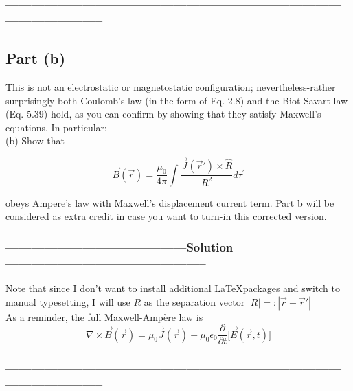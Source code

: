 \documentclass[a4paper,12pt]{article} %
\begin{document}
\subsubsection*{-----------------------------------------------------------------------------------------------------}
\subsection*{Part (b)}
This is not an electrostatic or magnetostatic configuration; nevertheless-rather surprisingly-both Coulomb's law (in the form of Eq. 2.8) and the Biot-Savart law (Eq. 5.39) hold, as you can confirm by showing that they satisfy Maxwell's equations. In particular:\\

(b) Show that

$$
\vec{B}(\vec{r})=\frac{\mu_0}{4 \pi} \int \frac{\vec{J}\left(\overrightarrow{r}'\right) \times \hat{R}}{R^2} d \tau^{\prime}
$$

obeys Ampere's law with Maxwell's displacement current term.
Part b will be considered as extra credit in case you want to turn-in this corrected version.

\subsubsection*{------------------------------------------Solution-----------------------------------------------}
Note that since I don't want to install additional \LaTeX  packages and switch to manual typesetting, I will use $R$ as the separation vector $|R| =: |\vec{r} - \overrightarrow{r}'| $\\

As a reminder, the full Maxwell-Ampère law is
\begin{equation}
\nabla \times \vec{B}(\vec{r}) = \mu_0\vec{J}(\vec{r}) + \mu_0\epsilon_0\frac{\partial}{\partial t} \Big[\vec{E}(\vec{r}, t)\Big]
	\label{eq:maxwell-ampere-law}
\end{equation}

\subsubsection*{-----------------------------------------------------------------------------------------------------}
\end{document}
